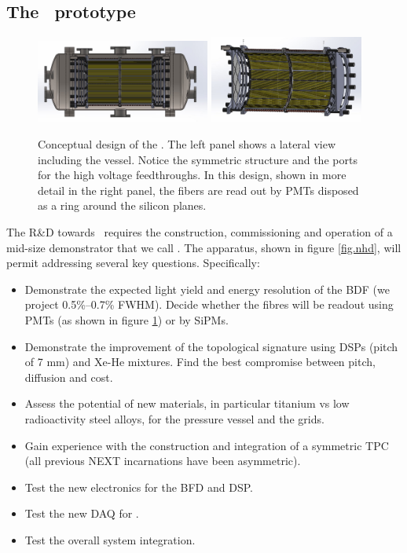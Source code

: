 \subsection{The \HDEMO\ prototype}

\begin{figure}
  \begin{center}
    \includegraphics[width=0.51\textwidth]{img2/nhd_vessel.jpg}
    \includegraphics[width=0.45\textwidth]{img2/nhd_view.jpg}
    \caption{Conceptual design of the \HDEMO. The left panel shows a lateral view including the vessel. Notice the symmetric structure and the ports for
    the high voltage feedthroughs. In this design, shown in more detail in the right panel, the fibers are read out by PMTs disposed as a ring around the silicon planes.} 
    \label{fig.hdemo}
  \end{center}
\end{figure}


\indent


The R\&D towards \NHD\ requires the construction, commissioning and operation of a mid-size demonstrator that we call \HDEMO. The apparatus, shown in figure \ref{fig.nhd}, will permit addressing several key questions. Specifically:

\indent


\begin{itemize}[noitemsep,topsep=0pt,parsep=0pt,partopsep=0pt]
\item Demonstrate the expected light yield and energy resolution of the BDF (we project 0.5\%--0.7\% FWHM). Decide whether the fibres will be readout using PMTs (as shown in figure \ref{fig.hdemo}) or by SiPMs. 
\item Demonstrate the improvement of the topological signature using DSPs (pitch of 7 mm) and Xe-He mixtures. Find the best compromise between pitch, diffusion and cost. 
\item Assess the potential of new materials, in particular titanium vs low radioactivity steel alloys, for the pressure vessel and the grids. 
\item Gain experience with the construction and integration of a symmetric TPC (all previous NEXT incarnations have been asymmetric). 
\item Test the new electronics for the BFD and DSP.
\item Test the new DAQ for \NHD.  
\item Test the overall system integration. 
\end{itemize}

